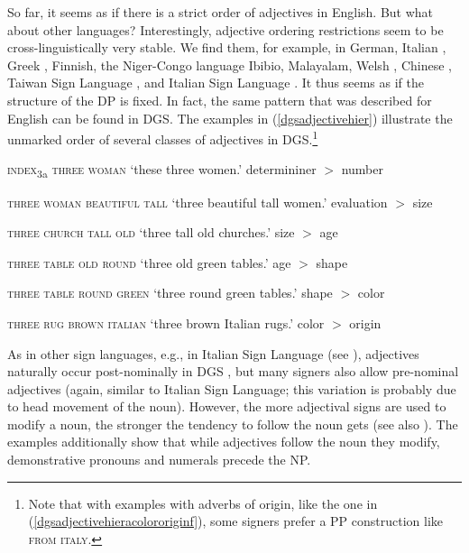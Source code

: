 \largerpage
So far, it seems as if there is a strict order of adjectives in English. But what about other languages? Interestingly, adjective ordering restrictions seem to be cross-linguistically very stable. We find them, for example, in German, Italian \citep{cinque2010syntax}, Greek \citep{alexiadou2001adjective}, Finnish, the Niger-Congo language Ibibio, Malayalam, Welsh \citep{scott2002stacked}, Chinese \citep{sproat1991cross}, Taiwan Sign Language \citep{zhang2007universal}, and Italian Sign Language \citep{bertone2009syntax, mantovan2017nominalmoditalian}. It thus seems as if the structure of the DP is fixed. In fact, the same pattern that was described for English can be found in DGS. The examples in (\ref{dgsadjectivehier}) illustrate the unmarked order of several classes of adjectives in DGS.\footnote{ Note that with examples with adverbs of origin, like the one in (\ref{dgsadjectivehieracolororiginf}), some signers prefer a PP construction like \textsc{from italy}.}

\begin{exe}
\ex\label{dgsadjectivehier}\begin{xlist} 
\ex \textsc{index}\textsubscript{3a} \textsc{three woman} 
\glt `these three women.' \hfill determininer $>$ number \label{dgsadjectivehiera}

\ex \textsc{three woman beautiful tall} 
\glt `three beautiful tall women.' \hfill evaluation $>$ size \label{dgsadjectivehierb}

\ex \textsc{three church tall old} 
\glt `three tall old churches.' \hfill size $>$ age \label{dgsadjectivehierc}

\ex \textsc{three table old round}%
\glt `three old green tables.' \hfill age $>$ shape \label{dgsadjectivehierd}

\ex  \textsc{three table round green}%
\glt `three round green tables.' \hfill shape $>$ color \label{dgsadjectivehiere}

\ex \textsc{three rug brown italian} 
\glt `three brown Italian rugs.' \hfill color $>$ origin \label{dgsadjectivehieracolororiginf}
\end{xlist}
\end{exe}

\noindent As in other sign languages, e.g., in Italian Sign Language (see \citealt[284]{cecchetto2009another}), adjectives naturally occur post-nominally in DGS \citep[18]{herrmann2013modal}, but many signers also allow pre-nominal adjectives (again, similar to Italian Sign Language; this variation is probably due to head movement of the noun). However, the more adjectival signs are used to modify a noun, the stronger the tendency to follow the noun gets (see also \citealt[146]{papaspyrou2008grammatik}). The examples additionally show that while adjectives follow the noun they modify, demonstrative pronouns and numerals precede the NP.

